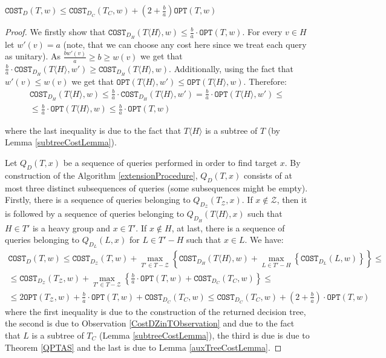 \documentclass[a4paper, anonymous, numberwithinsect, pdfa, UKenglish,cleveref, autoref, thm-restate]{socg-lipics-v2021}
\newcommand{\br}[1]{\left( #1 \right)}
\newcommand{\brc}[1]{\left\{ #1 \right\}}
\newcommand{\angl}[1]{\langle #1 \rangle}
\newcommand{\OPT}{\texttt{OPT}}
\newcommand{\COST}{\texttt{COST}}
\begin{document}
\begin{lemma}
    $\COST_D\br{T,w}\leq\COST_{D_C}\br{T_C,w}+\br{2+\frac{b}{a}}\OPT\br{T,w}$
    \begin{proof}
    We firstly show that $\COST_{D_H}\br{T\angl{H}, w}\leq \frac{b}{a}\cdot\OPT\br{T, w}$. For every $v\in H$ let $w'\br{v}=a$ (note, that we can choose any cost here since we treat each query as unitary). As $\frac{bw'\br{v}}{a}\geq b \geq w\br{v}$ we get that $\frac{b}{a}\cdot\COST_{D_H}\br{T\angl{H}, w'}\geq \COST_{D_H}\br{T\angl{H}, w}$. Additionally, using the fact that $w'\br{v} \leq w\br{v}$ we get that $\OPT\br{T\angl{H}, w'}\leq \OPT\br{T\angl{H}, w}$. Therefore:
    $$
    \begin{gathered}
        \COST_{D_H}\br{T\angl{H}, w}\leq \frac{b}{a}\cdot\COST_{D_H}\br{T\angl{H}, w'}=\frac{b}{a}\cdot\OPT\br{T\angl{H}, w'}\leq \\
        \leq
        \frac{b}{a}\cdot\OPT\br{T\angl{H}, w}\leq \frac{b}{a}\cdot\OPT\br{T, w}
    \end{gathered}
    $$
        
    where the last inequality is due to the fact that $T\angl{H}$ is a subtree of $T$ (by Lemma \ref{subtreeCostLemma}).
        
    Let $Q_D\br{T,x}$ be a sequence of queries performed in order to find target $x$. By construction of the Algorithm \ref{extensionProcedure}, $Q_D\br{T,x}$ consists of at most three distinct subsequences of queries (some subsequences might be empty). Firstly, there is a sequence of queries belonging to $Q_{D_{\mathcal{Z}}}\br{T_{\mathcal{Z}},x}$. If $x\notin \mathcal{Z}$, then it is followed by a sequence of queries belonging to $Q_{D_{H}}\br{T\angl{H},x}$ such that $H\in T'$ is a heavy group and $x\in T'$. If $x\notin H$, at last, there is a sequence of queries belonging to $Q_{D_{L}}\br{L,x}$ for $L\in T'-H$ such that $x\in L$. 
    We have:
        $$
        \begin{gathered}
        \COST_D\br{T,w}
        \leq
        \COST_{D_{\mathcal{Z}}}\br{T, w}+\max_{T'\in T-\mathcal{Z}}\brc{\COST_{D_H}\br{T\angl{H}, w}+\max_{L\in T'-H}\brc{\COST_{D_L}\br{L, w}}}
        \leq \\ \leq
        \COST_{D_{\mathcal{Z}}}\br{T_{\mathcal{Z}}, w}+\max_{T'\in T-\mathcal{Z}}\brc{\frac{b}{a}\cdot\OPT\br{T, w}+\COST_{D_C}\br{T_C, w}}
        \leq \\ \leq 
        2\OPT\br{T_{\mathcal{Z}}, w}+\frac{b}{a}\cdot\OPT\br{T, w}+ \COST_{D_C}\br{T_C, w} \leq \COST_{D_C}\br{T_C, w} + \br{2+\frac{b}{a}}\cdot\OPT\br{T, w}
        \end{gathered}
        $$
        where the first inequality is due to the construction of the returned decision tree, the second is due to Observation \ref{CostDZinTObservation} and due to the fact that $L$ is a subtree of $T_C$ (Lemma \ref{subtreeCostLemma}), the third is due is due to Theorem \ref{QPTAS} and the last is due to Lemma \ref{auxTreeCostLemma}.
        
    \end{proof}
\end{lemma}
\end{document}
